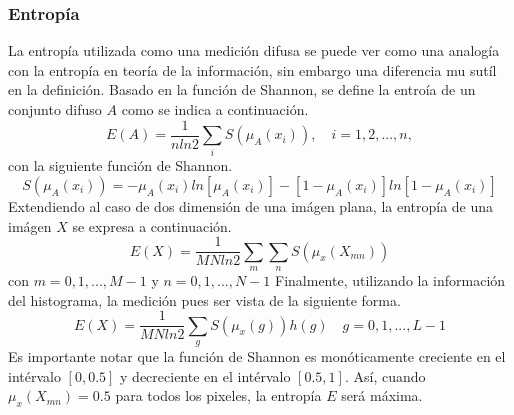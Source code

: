 \documentclass[preprint,12pt]{elsarticle}
\begin{document}
\subsubsection{Entropía}
La entropía utilizada como una medición difusa se puede ver como una analogía con la entropía en teoría de la información, sin embargo una diferencia mu sutíl en la definición.
%
Basado en la función de Shannon, se define la entroía de un conjunto  difuso $A$ como se indica a continuación.
\begin{equation}
    E(A) = \frac{1}{n ln 2} \sum_i S(\mu_A(x_i)), \quad i =1, 2, ..., n,
\end{equation}
con la siguiente función de Shannon.
\begin{equation}
    S(\mu_A(x_i)) = - \mu_A(x_i) ln[ \mu_A(x_i) ] - [1-\mu_A(x_i)]ln[1-\mu_A(x_i)]
\end{equation}
Extendiendo al caso de dos dimensión de una imágen plana, la entropía de una imágen $X$ se expresa a continuación.
\begin{equation}
    E(X) = \frac{1}{MN ln 2} \sum_m \sum_n S(\mu_x(X_{mn}))
\end{equation}
con $m=0,1,...,M-1$ y $n=0,1,...,N-1$
Finalmente, utilizando la información del histograma, la medición pues ser vista de la siguiente forma.
\begin{equation}
    E(X) =\frac{1}{MNln2} \sum_g S(\mu_x(g)) h(g) \quad g=0,1,...,L-1
\end{equation}
Es importante notar que la función de Shannon es monóticamente creciente en el intérvalo $[0, 0.5]$ y decreciente en el intérvalo $[0.5, 1]$.
%
Así, cuando $\mu_x(X_{mn}) = 0.5$ para todos los pixeles, la entropía $E$ será máxima.
\end{document}
